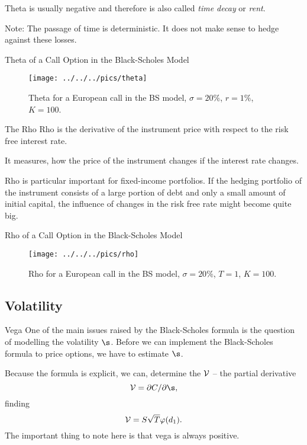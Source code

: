 	Theta is usually negative and therefore is also called \emph{time decay}
  or \emph{rent}.
  
	Note: The passage of time is deterministic. It does not make sense to
  hedge against these losses.



Theta of a Call Option in the Black-Scholes Model
\begin{figure}[htp]
\begin{center}
  \texttt{[image: ../../../pics/theta]}
  \caption{Theta for a European call in the BS model, $\sigma=20\%$, $r=1\%$,
  $K=100$.}
  \label{fig:thetaBS}
\end{center}
\end{figure}



The Rho
	Rho is the derivative of the instrument price with respect to the risk
	free interest rate.
	
	It measures, how the price of the instrument changes if the interest
  rate changes.
  
	Rho is particular important for fixed-income portfolios. If the hedging
  portfolio of the instrument consists of a large portion of debt and only a
  small amount of initial capital, the influence of changes in the risk free
  rate might become quite big.


Rho of a Call Option in the Black-Scholes Model
\begin{figure}[htp]
\begin{center}
  \texttt{[image: ../../../pics/rho]}
  \caption{Rho for a European call in the BS model, $\sigma=20\%$, $T=1$,
  $K=100$.}
  \label{fig:rhoBS}
\end{center}
\end{figure}


\subsection{Volatility}
Vega
	One of the main issues raised by the Black-Scholes formula is the
	question of modelling the volatility $\s$. Before we can implement
	the Black-Scholes formula to price options, we have to estimate $\s$.

	Because the formula is explicit, we can, determine the ${\cal V}$
	-- the partial derivative
		$$
		{\cal V} = \partial C/\partial \s,
		$$
	finding
		$$
		{\cal V} = S \sqrt{T} \varphi(d_1).
		$$
	The important thing to note here is that vega is always positive.

